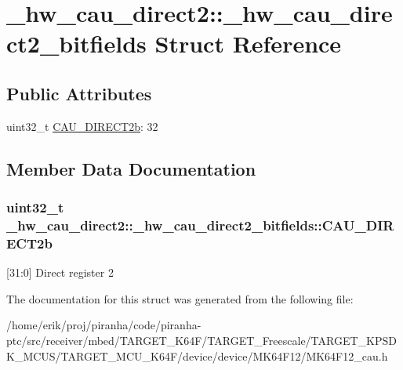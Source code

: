 \hypertarget{struct__hw__cau__direct2_1_1__hw__cau__direct2__bitfields}{}\section{\+\_\+hw\+\_\+cau\+\_\+direct2\+:\+:\+\_\+hw\+\_\+cau\+\_\+direct2\+\_\+bitfields Struct Reference}
\label{struct__hw__cau__direct2_1_1__hw__cau__direct2__bitfields}
\subsection*{Public Attributes}
\begin{DoxyCompactItemize}
\item 
uint32\+\_\+t \hyperlink{struct__hw__cau__direct2_1_1__hw__cau__direct2__bitfields_ae5dd9694c59d879062648cb501598f41}{C\+A\+U\+\_\+\+D\+I\+R\+E\+C\+T2b}\+: 32
\end{DoxyCompactItemize}


\subsection{Member Data Documentation}
\subsubsection[{\texorpdfstring{C\+A\+U\+\_\+\+D\+I\+R\+E\+C\+T2b}{CAU_DIRECT2b}}]{\setlength{\rightskip}{0pt plus 5cm}uint32\+\_\+t \+\_\+hw\+\_\+cau\+\_\+direct2\+::\+\_\+hw\+\_\+cau\+\_\+direct2\+\_\+bitfields\+::\+C\+A\+U\+\_\+\+D\+I\+R\+E\+C\+T2b}\hypertarget{struct__hw__cau__direct2_1_1__hw__cau__direct2__bitfields_ae5dd9694c59d879062648cb501598f41}{}\label{struct__hw__cau__direct2_1_1__hw__cau__direct2__bitfields_ae5dd9694c59d879062648cb501598f41}
\mbox{[}31\+:0\mbox{]} Direct register 2 

The documentation for this struct was generated from the following file\+:\begin{DoxyCompactItemize}
\item 
/home/erik/proj/piranha/code/piranha-\/ptc/src/receiver/mbed/\+T\+A\+R\+G\+E\+T\+\_\+\+K64\+F/\+T\+A\+R\+G\+E\+T\+\_\+\+Freescale/\+T\+A\+R\+G\+E\+T\+\_\+\+K\+P\+S\+D\+K\+\_\+\+M\+C\+U\+S/\+T\+A\+R\+G\+E\+T\+\_\+\+M\+C\+U\+\_\+\+K64\+F/device/device/\+M\+K64\+F12/M\+K64\+F12\+\_\+cau.\+h\end{DoxyCompactItemize}
